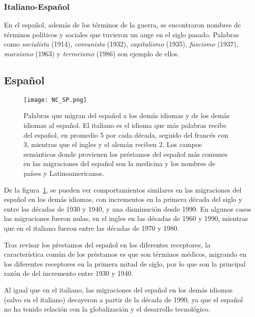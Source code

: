 \subsubsection*{Italiano-Español}%

En el español, además de los términos de la guerra, se encontraron nombres de términos políticos y sociales que tuvieron un auge en el siglo pasado. Palabras como  \textit{socialista} (1914), \textit{comunista} (1932), \textit{capitalismo} (1935), \textit{fascismo} (1937),  \textit{marxismo} (1963) y \textit{terrorismo} (1986) son ejemplo de ellos. 



\subsection{Español}%

\begin{figure}[h!] %
	\centering
	\texttt{[image: NC\_SP.png]}
	\caption{Palabras que migran del español a los demás idiomas y de los demás idiomas al español. El italiano es el idioma que más palabras recibe del español, en promedio 5 por cada década, seguido del francés con 3, mientras que el ingles y el alemán reciben 2. Los campos semánticos donde provienen los préstamos del español  más comunes en las migraciones del español son la medicina y los nombres de países y Latinoamericanos. }
	\label{fig.NC_SP}
\end{figure} %


De la figura~\ref{fig.NC_SP}, se pueden ver comportamientos similares en las migraciones del español en los demás idiomas, con incrementos en la primera década del siglo y entre las décadas de 1930 y 1940,  y una disminución desde 1990. En algunos casos las migraciones fueron nulas, en el ingles en las décadas de 1960 y 1990, mientras que en el italiano fueron entre las décadas de 1970  y 1980. 

Tras revisar los pŕestamos del español en los diferentes receptores,  la característica común de los préstamos es que son términos médicos, migrando en los diferentes receptores en la primera mitad de siglo, por lo que son la principal razón de del incremento entre 1930 y 1940. 

Al igual que en el italiano, las migraciones del español en los demás idiomas (salvo en el italiano) decayeron a partir de la década de 1990, ya que el español no ha tenido relación con la globalización y el desarrollo tecnológico. 

